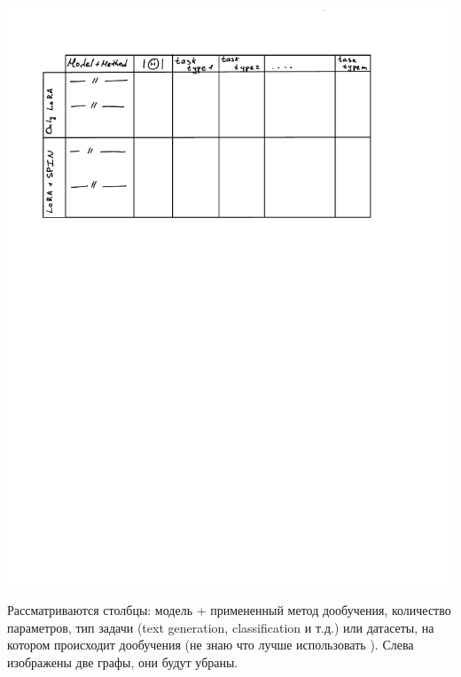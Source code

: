 \documentclass[12pt, twoside]{article}
\begin{document}
\includegraphics{images/table_draft.pdf}

Рассматриваются столбцы: модель + примененный метод дообучения, количество параметров, тип задачи (text generation, classification и т.д.) или датасеты, на котором происходит дообучения (не знаю что лучше использовать ). Слева изображены две графы, они будут убраны.

\printbibliography
\end{document}
